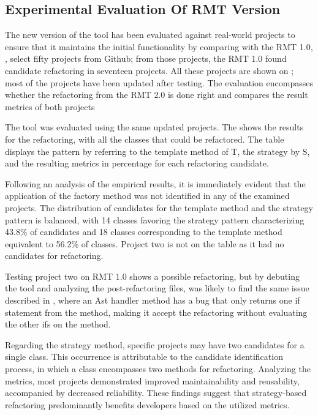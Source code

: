 \subsection{Experimental Evaluation Of RMT Version}
\label{sub-testing-real}

The new version of the tool has been evaluated against real-world projects to ensure that it maintains the initial functionality by comparing with the RMT 1.0, \textcite{beluzzo2018abordagem}, select fifty projects from Github; from those projects, the RMT 1.0 found candidate refactoring in seventeen projects. All these projects are shown on ; most of the projects have been updated after \cite{beluzzo2018abordagem} testing. The evaluation encompasses whether the refactoring from the RMT 2.0 is done right and compares the result metrics of both projects



The tool was evaluated using the same updated projects. The  shows the results for the refactoring, with all the classes that could be refactored. The table displays the pattern by referring to the template method of T, the strategy by S, and the resulting metrics in percentage for each refactoring candidate.

Following an analysis of the empirical results, it is immediately evident that the application of the factory method was not identified in any of the examined projects. The distribution of candidates for the template method and the strategy pattern is balanced, with 14 classes favoring the strategy pattern characterizing 43.8\% of candidates and 18 classes corresponding to the template method equivalent to 56.2\% of classes. Project two is not on the table as it had no candidates for refactoring.

Testing project two on RMT 1.0 shows a possible refactoring, but by debuting the tool and analyzing the post-refactoring files, was likely to find the same issue described in , where an Ast handler method has a bug that only returns one if statement from the method, making it accept the refactoring without evaluating the other ifs on the method.

Regarding the strategy method, specific projects may have two candidates for a single class. This occurrence is attributable to the candidate identification process, in which a class encompasses two methods for refactoring. Analyzing the metrics, most projects demonstrated improved maintainability and reusability, accompanied by decreased reliability. These findings suggest that strategy-based refactoring predominantly benefits developers based on the utilized metrics.


